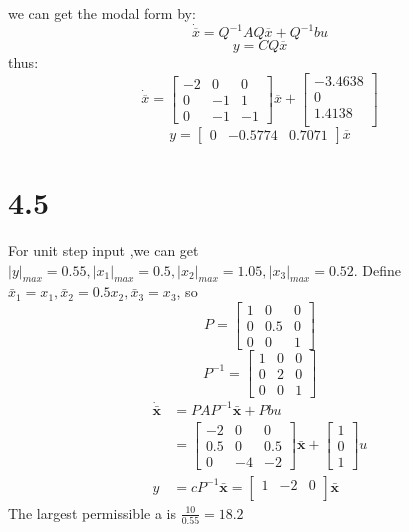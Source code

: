 \documentclass{article}
\begin{document}
we can get the modal form by:
\[
\dot{\overline{x}}=Q^{-1}AQ\overline{x}+Q^{-1}bu
\]
\[y=CQ\overline{x}\]
thus:
\[
\dot{\overline{x}}=
\left[
\begin{array}{ccc}
-2 & 0 & 0\\
0 & -1 & 1\\
0& -1 & -1
\end{array}
\right]\overline{x}+
\left[
\begin{array}{c}
-3.4638\\
0\\
1.4138\\
\end{array}
\right]
\]
\[y=
\left[
\begin{array}{ccc}
0 & -0.5774 & 0.7071
\end{array}
\right]\overline{x}
\]
\section*{4.5}
For unit step input ,we can get $|y|_{max}=0.55,|x_{1}|_{max}=0.5,|x_{2}|_{max}=1.05,|x_{3}|_{max}=0.52$. Define $\bar{x}_{1}=x_{1},\bar{x}_{2}=0.5x_{2},\bar{x}_{3}=x_{3}$, so
$$
P=
\begin{bmatrix}
1&0&0\\
0&0.5&0\\
0&0&1
\end{bmatrix}
$$$$
P^{-1}=
\begin{bmatrix}
1&0&0\\
0&2&0\\
0&0&1
\end{bmatrix}
$$
$$
\begin{aligned}
\dot{\bar{\pmb{x}}}&=PAP^{-1}\bar{\pmb{x}}+Pbu\\
&=\begin{bmatrix}
-2&0 &0\\
0.5&0&0.5\\
0&-4&-2
\end{bmatrix}\bar{\pmb{x}}+\begin{bmatrix}
1\\0\\1
\end{bmatrix}u\\
y&=cP^{-1}\bar{\pmb{x}}=\begin{bmatrix}
1&-2&0\\
\end{bmatrix}\bar{\pmb{x}}
\end{aligned}
$$
The largest permissible a is $\frac{10}{0.55}=18.2$
\end{document}
